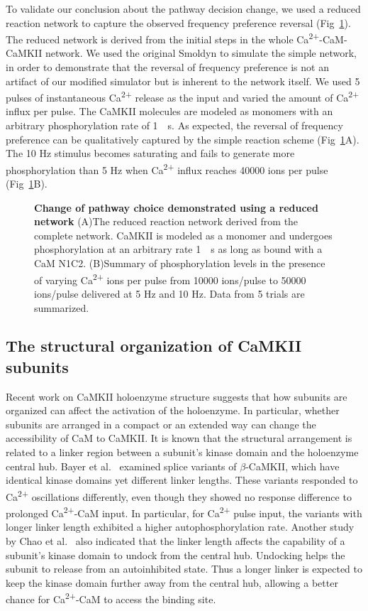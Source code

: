 \documentclass[10pt,letterpaper]{article}
\begin{document}
To validate our conclusion about the pathway decision change, we used a reduced reaction network to capture the observed frequency preference reversal (Fig~\ref{fig11}). The reduced network is derived from the initial steps in the whole Ca\textsuperscript{2+}-CaM-CaMKII network. We used the original Smoldyn to simulate the simple network, in order to demonstrate that the reversal of frequency preference is not an artifact of our modified simulator but is inherent to the network itself. We used 5 pulses of instantaneous Ca\textsuperscript{2+} release as the input and varied the amount of Ca\textsuperscript{2+} influx per pulse. The CaMKII molecules are modeled as monomers with an arbitrary phosphorylation rate of \SI{1}{\per\s}. As expected, the reversal of frequency preference can be qualitatively captured by the simple reaction scheme (Fig~\ref{fig11}A). The 10 Hz stimulus becomes saturating and fails to generate more phosphorylation than 5 Hz when Ca\textsuperscript{2+} influx reaches 40000 ions per pulse (Fig~\ref{fig11}B).

\begin{figure}[!h]
	\caption{{\bf Change of pathway choice demonstrated using a reduced network}
	(A)The reduced reaction network derived from the complete network. CaMKII is modeled as a monomer and undergoes phosphorylation at an arbitrary rate \SI{1}{\per\s} as long as bound with a CaM N1C2. 
	(B)Summary of phosphorylation levels in the presence of varying Ca\textsuperscript{2+} ions per pulse from 10000 ions/pulse to 50000 ions/pulse delivered at 5 Hz and 10 Hz. Data from 5 trials are summarized.
	}
\label{fig11}
\end{figure}


\subsection*{The structural organization of CaMKII subunits}

Recent work on CaMKII holoenzyme structure suggests that how subunits are organized can affect the activation of the holoenzyme. In particular, whether subunits are arranged in a compact or an extended way can change the accessibility of CaM to CaMKII. It is known that the structural arrangement is related to a linker region between a subunit's kinase domain and the holoenzyme central hub. Bayer et al.~\cite{Bayer:2002er} examined splice variants of $\beta$-CaMKII, which have identical kinase domains yet different linker lengths. These variants responded to Ca\textsuperscript{2+} oscillations differently, even though they showed no response difference to prolonged Ca\textsuperscript{2+}-CaM input. In particular, for Ca\textsuperscript{2+} pulse input, the variants with longer linker length exhibited a higher autophosphorylation rate. Another study by Chao et al.~\cite{Chao:2011iw} also indicated that the linker length affects the capability of a subunit's kinase domain to undock from the central hub. Undocking helps the subunit to release from an autoinhibited state. Thus a longer linker is expected to keep the kinase domain further away from the central hub, allowing a better chance for Ca\textsuperscript{2+}-CaM to access the binding site.
\end{document}

